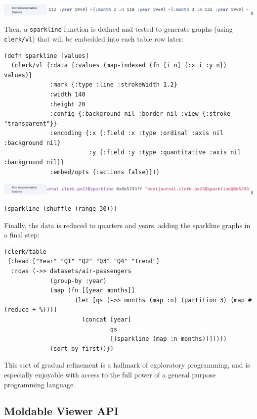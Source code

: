 \documentclass[sigconf,screen]{acmart}
\newcommand{\passthrough}[1]{#1}
\begin{document}
\includegraphics{images/result-anon-expr-5drcDeJRcpX2uPqZi7XJch2DedHM6j.png}

Then, a \passthrough{\lstinline!sparkline!} function is defined and tested to generate graphs (using \passthrough{\lstinline!clerk/vl!}) that will be embedded into each table row later:

\begin{lstlisting}
(defn sparkline [values]
  (clerk/vl {:data {:values (map-indexed (fn [i n] {:x i :y n}) values)}
             :mark {:type :line :strokeWidth 1.2}
             :width 140
             :height 20
             :config {:background nil :border nil :view {:stroke "transparent"}}
             :encoding {:x {:field :x :type :ordinal :axis nil :background nil}
                        :y {:field :y :type :quantitative :axis nil :background nil}}
             :embed/opts {:actions false}}))
\end{lstlisting}

\includegraphics{images/result-sparkline.png}

\begin{lstlisting}
(sparkline (shuffle (range 30)))
\end{lstlisting}

Finally, the data is reduced to quarters and years, adding the sparkline graphs in a final step:

\begin{lstlisting}
(clerk/table
 {:head ["Year" "Q1" "Q2" "Q3" "Q4" "Trend"]
  :rows (->> datasets/air-passengers
             (group-by :year)
             (map (fn [[year months]]
                    (let [qs (->> months (map :n) (partition 3) (map #(reduce + %)))]
                      (concat [year] 
                              qs 
                              [(sparkline (map :n months))]))))
             (sort-by first))})
\end{lstlisting}

This sort of gradual refinement is a hallmark of exploratory programming, and is especially enjoyable with access to the full power of a general purpose programming language.

\hypertarget{id}{%
\subsection{Moldable Viewer API}\label{id}}
\end{document}
